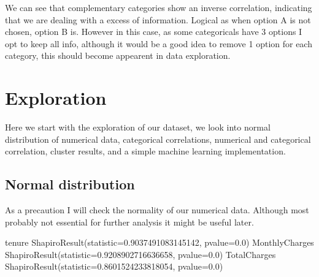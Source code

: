 \documentclass[letterpaper,10pt,english]{jupyterBook}
\begin{document}
\sphinxAtStartPar
We can see that complementary categories show an inverse correlation, indicating that we are dealing with a excess of information.
Logical as when option A is not chosen, option B is.
However in this case, as some categoricals have 3 options I opt to keep all info, although it would be a good idea to remove 1 option for each category, this should become appearent in data exploration.


\section{Exploration}
\label{\detokenize{c7_case_studies/Churn:exploration}}
\sphinxAtStartPar
Here we start with the exploration of our dataset, we look into normal distribution of numerical data, categorical correlations, numerical and categorical correlation, cluster results, and a simple machine learning implementation.


\subsection{Normal distribution}
\label{\detokenize{c7_case_studies/Churn:normal-distribution}}
\sphinxAtStartPar
As a precaution I will check the normality of our numerical data.
Although most probably not essential for further analysis it might be useful later.

\begin{sphinxVerbatim}[commandchars=\\\{\}]
    \PYG{p}{[}\PYG{p}{[}  \PYG{p}{]}\PYG{p}{]}
\end{sphinxVerbatim}

\begin{sphinxVerbatim}[commandchars=\\\{\}]
tenure
ShapiroResult(statistic=0.9037491083145142, pvalue=0.0)
MonthlyCharges
ShapiroResult(statistic=0.9208902716636658, pvalue=0.0)
TotalCharges
ShapiroResult(statistic=0.8601524233818054, pvalue=0.0)
\end{sphinxVerbatim}
\end{document}
